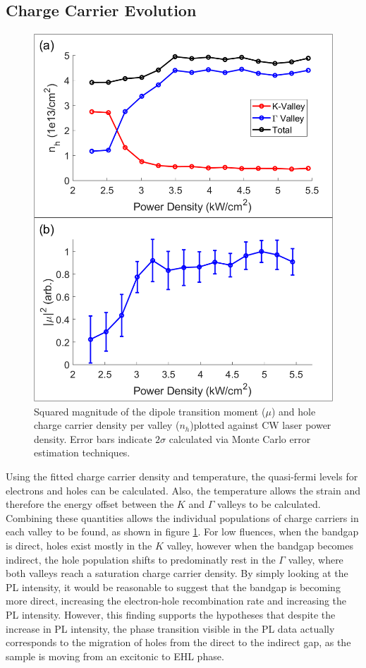 \documentclass[aps,prb,preprint,groupedaddress]{revtex4-2}
\begin{document}
\subsection{Charge Carrier Evolution}

\begin{figure}
	\includegraphics[width=0.5\linewidth]{fig_npervalley+dipole.png}
	\caption{Squared magnitude of the dipole transition moment ($\mu$) and hole charge carrier density per valley ($n_h$)plotted against CW laser power density. Error bars indicate $2\sigma$ calculated via Monte Carlo error estimation techniques.}
	\label{fig:n}
\end{figure}


Using the fitted charge carrier density and temperature, the quasi-fermi levels for electrons and holes can be calculated. Also, the temperature allows the strain and therefore the energy offset between the $K$ and $\Gamma$ valleys to be calculated. Combining these quantities allows the individual populations of charge carriers in each valley to be found, as shown in figure \ref{fig:n}. For low fluences, when the bandgap is direct, holes exist mostly in the $K$ valley, however when the bandgap becomes indirect, the hole population shifts to predominatly rest in the $\Gamma$ valley, where both valleys reach a saturation charge carrier density. By simply looking at the PL intensity, it would be reasonable to suggest that the bandgap is becoming more direct, increasing the electron-hole recombination rate and increasing the PL intensity. However, this finding supports the hypotheses that despite the increase in PL intensity, the phase transition visible in the PL data actually corresponds to the migration of holes from the direct to the indirect gap, as the sample is moving from an excitonic to EHL phase.
\end{document}
